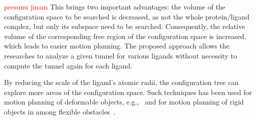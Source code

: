 \documentclass{svmult}
\newcommand{\red}[1]{\textcolor{red}{#1}}
\begin{document}
\red{presunu jinam}
This brings two important advantages: the volume of the configuration space to be searched is decreased, as not the whole
protein/ligand complex, but only its subspace need to be searched.
Consequently, the relative volume of the corresponding free region of the configuration space is increased, which leads to easier motion planning.
The proposed approach allows the researches to analyze a given tunnel for various ligands without necessity to compute the tunnel
again for each ligand.




%


By reducing the scale of the ligand's atomic radii, the configuration tree can explore more areas of the configuration space.
Such techniques has been used for motion planning of deformable objects, 
e.g.,~\cite{frank2008efficient,bayazit2001ligand,alterovitz2008motion,lamiraux2001flexible,kavraki1998towards,gayle2005path} 
and for motion planning of rigid objects in among 
flexible obstacles~\cite{rodriguez2006planning,frank2008efficient,phillips2014representation}.
\end{document}
